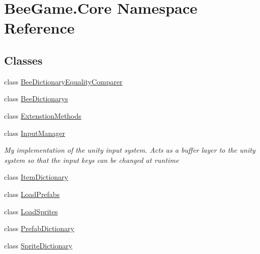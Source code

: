 \hypertarget{namespace_bee_game_1_1_core}{}\section{Bee\+Game.\+Core Namespace Reference}
\label{namespace_bee_game_1_1_core}
\subsection*{Classes}
\begin{DoxyCompactItemize}
\item 
class \hyperlink{class_bee_game_1_1_core_1_1_bee_dictionary_equality_comparer}{Bee\+Dictionary\+Equality\+Comparer}
\item 
class \hyperlink{class_bee_game_1_1_core_1_1_bee_dictionarys}{Bee\+Dictionarys}
\item 
class \hyperlink{class_bee_game_1_1_core_1_1_extenstion_methods}{Extenstion\+Methods}
\item 
class \hyperlink{class_bee_game_1_1_core_1_1_input_manager}{Input\+Manager}
\begin{DoxyCompactList}\small\item\em My implementation of the unity input system. Acts as a buffer layer to the unity system so that the input keys can be changed at runtime \end{DoxyCompactList}\item 
class \hyperlink{class_bee_game_1_1_core_1_1_item_dictionary}{Item\+Dictionary}
\item 
class \hyperlink{class_bee_game_1_1_core_1_1_load_prefabs}{Load\+Prefabs}
\item 
class \hyperlink{class_bee_game_1_1_core_1_1_load_sprites}{Load\+Sprites}
\item 
class \hyperlink{class_bee_game_1_1_core_1_1_prefab_dictionary}{Prefab\+Dictionary}
\item 
class \hyperlink{class_bee_game_1_1_core_1_1_sprite_dictionary}{Sprite\+Dictionary}
\end{DoxyCompactItemize}
